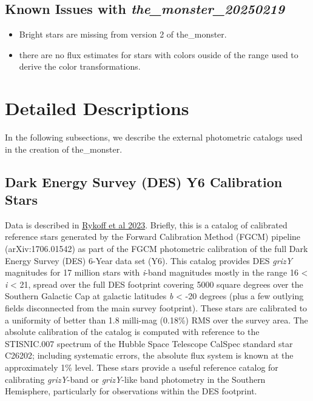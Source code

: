 
\newpage

\subsection{Known Issues with \emph{the_monster_20250219}}
\begin{itemize}
    \item Bright stars are missing from version 2 of the\_monster.
    \item there are no flux estimates for stars with colors ouside of the range used to derive the color transformations.
\end{itemize}

\section{Detailed Descriptions}
\label{sec:details}
In the following subsections, we describe the external photometric catalogs used in the creation of the\_monster.

\subsection{Dark Energy Survey (DES) Y6 Calibration Stars}
\label{sec:des}
Data is described in \href{https://arxiv.org/abs/2305.01695}{Rykoff et al 2023}.
Briefly, this is a catalog of calibrated reference stars generated by the Forward Calibration Method (FGCM) pipeline (arXiv:1706.01542) as part of the FGCM photometric calibration of the full Dark Energy Survey (DES) 6-Year data set (Y6). This catalog provides DES \textit{grizY} magnitudes for 17 million stars with \textit{i}-band magnitudes mostly in the range 16 < \textit{i} < 21, spread over the full DES footprint covering 5000 square degrees over the Southern Galactic Cap at galactic latitudes \textit{b} < -20 degrees (plus a few outlying fields disconnected from the main survey footprint). 
These stars are calibrated to a uniformity of better than 1.8 milli-mag (0.18\%) RMS over the survey area. 
The absolute calibration of the catalog is computed with reference to the STISNIC.007 spectrum of the Hubble Space Telescope CalSpec standard star C26202; including systematic errors, the absolute flux system is known at the approximately 1\% level. 
These stars provide a useful reference catalog for calibrating \textit{grizY}-band or \textit{grizY}-like band photometry in the Southern Hemisphere, particularly for observations within the DES footprint.

